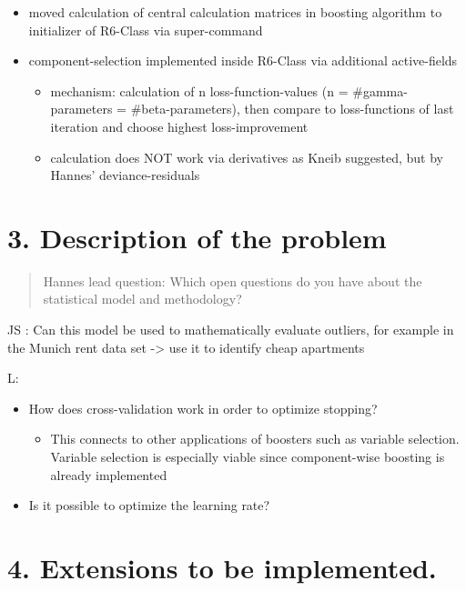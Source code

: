 \documentclass[
]{report}
\providecommand{\tightlist}{%
  \setlength{\itemsep}{0pt}\setlength{\parskip}{0pt}}
\begin{document}
\begin{itemize}
\tightlist
\item
  moved calculation of central calculation matrices in boosting
  algorithm to initializer of R6-Class via super-command
\item
  component-selection implemented inside R6-Class via additional
  active-fields

  \begin{itemize}
  \tightlist
  \item
    mechanism: calculation of n loss-function-values (n =
    \#gamma-parameters = \#beta-parameters), then compare to
    loss-functions of last iteration and choose highest loss-improvement
  \item
    calculation does NOT work via derivatives as Kneib suggested, but by
    Hannes' deviance-residuals
  \end{itemize}
\end{itemize}

\hypertarget{description-of-the-problem}{%
\chapter{3. Description of the
problem}\label{description-of-the-problem}}

\begin{quote}
Hannes lead question: Which open questions do you have about the
statistical model and methodology?
\end{quote}

JS : Can this model be used to mathematically evaluate outliers, for
example in the Munich rent data set -\textgreater{} use it to identify
cheap apartments

L:

\begin{itemize}
\tightlist
\item
  How does cross-validation work in order to optimize stopping?

  \begin{itemize}
  \tightlist
  \item
    This connects to other applications of boosters such as variable
    selection. Variable selection is especially viable since
    component-wise boosting is already implemented
  \end{itemize}
\item
  Is it possible to optimize the learning rate?
\end{itemize}

\hypertarget{extensions-to-be-implemented.}{%
\chapter{4. Extensions to be
implemented.}\label{extensions-to-be-implemented.}}
\end{document}
